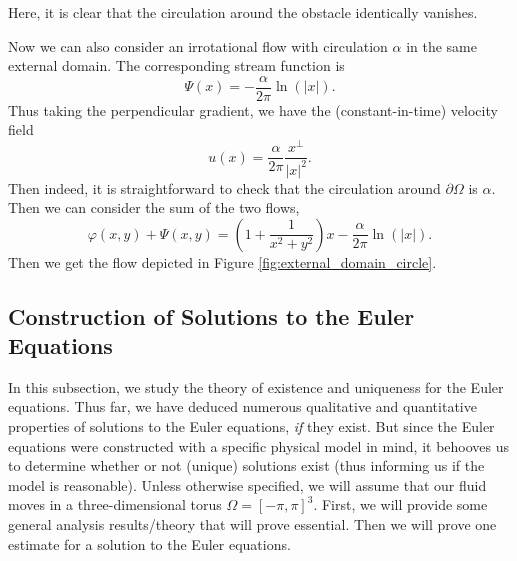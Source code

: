 \documentclass{article}
\begin{document}
Here, it is clear that the circulation around the obstacle identically vanishes. 

Now we can also consider an irrotational flow with circulation $\alpha$ in the same external domain. The corresponding stream function is 
\begin{equation*}
	\Psi(x) = -\frac{\alpha}{2\pi}\ln(|x|). 
\end{equation*} 
Thus taking the perpendicular gradient, we have the (constant-in-time) velocity field 
\begin{equation*}
	u(x) = \frac{\alpha}{2\pi}\frac{x^{\perp}}{|x|^{2}}. 
\end{equation*} 
Then indeed, it is straightforward to check that the circulation around $\partial\Omega$ is $\alpha$. Then we can consider the sum of the two flows, 
\begin{equation*}
	\varphi(x, y) + \Psi(x, y) = \left(1 + \frac{1}{x^{2} + y^{2}}\right)x -\frac{\alpha}{2\pi}\ln(|x|). 
\end{equation*}
Then we get the flow depicted in Figure \ref{fig:external_domain_circle}. 

\newpage 
\subsection{Construction of Solutions to the Euler Equations}
In this subsection, we study the theory of existence and uniqueness for the Euler equations. Thus far, we have deduced numerous qualitative and quantitative properties of solutions to the Euler equations, \textit{if} they exist. But since the Euler equations were constructed with a specific physical model in mind, it behooves us to determine whether or not (unique) solutions exist (thus informing us if the model is reasonable). Unless otherwise specified, we will assume that our fluid moves in a three-dimensional torus $\Omega = [-\pi, \pi]^{3}$. First, we will provide some general analysis results/theory that will prove essential. Then we will prove one estimate for a solution to the Euler equations. 
\end{document}
